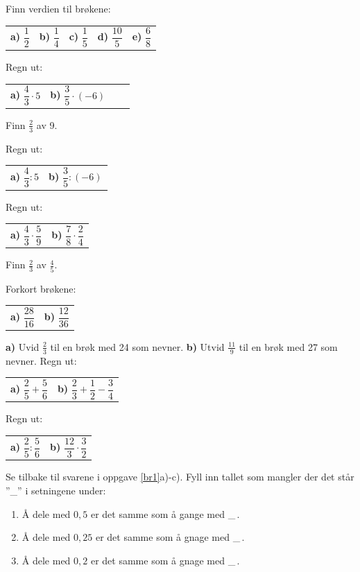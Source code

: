 



\opgt
{}
Finn verdien til brøkene:\os
\begin{tabular}{@{}l l l l l}
	\textbf{a)} $ \dfrac{1}{2} $ & 	
	\textbf{b)} $ \dfrac{1}{4} $ & 	
	\textbf{c)} $ \dfrac{1}{5} $ &
	\textbf{d)} $ \dfrac{10}{5} $  & 
	\textbf{e)} $ \dfrac{6}{8} $
\end{tabular}
\nes

Regn ut:\os
\begin{tabular}{@{}l l l l}
	\textbf{a)} $ \dfrac{4}{3}\cdot5 $ & 	\textbf{b)} $ \dfrac{3}{5}\cdot(-6) $ 
\end{tabular}

Finn $ \frac{2}{3} $ av 9.

\nes
{}
Regn ut:\os
\begin{tabular}{@{}l l}
	\textbf{a)} $ \dfrac{4}{3}:5 $ & 	\textbf{b)} $ \dfrac{3}{5}:(-6) $
\end{tabular}

\nes
{}
Regn ut:\os
\begin{tabular}{@{}l l}
	\textbf{a)} $ \dfrac{4}{3}\cdot\dfrac{5}{9} $ & 	\textbf{b)} $ \dfrac{7}{8}\cdot\dfrac{2}{4} $ 
\end{tabular}

Finn $ \frac{2}{3} $ av $ \frac{4}{5} $.

\nes
\nes

Forkort brøkene:\os
\begin{tabular}{@{}l l}
	\textbf{a)} $ \dfrac{28}{16} $ & 	\textbf{b)} $ \dfrac{12}{36} $ 
\end{tabular}

\textbf{a)} Uvid $ \frac{2}{3} $ til en brøk med 24 som nevner.\os
\textbf{b)} Utvid $ \frac{11}{9} $ til en brøk med 27 som nevner. 
\newpage
\nes
{}
Regn ut:\os
\begin{tabular}{@{}l l }
\textbf{a)}	$ \dfrac{2}{5}+\dfrac{5}{6} $&\textbf{b)} $ \dfrac{2}{3}+\dfrac{1}{2}-\dfrac{3}{4} $
\end{tabular}

\nes
{}
Regn ut:\os
\begin{tabular}{@{}l l }
	\textbf{a)}	$ \dfrac{2}{5}:\dfrac{5}{6} $&\textbf{b)} $ \dfrac{12}{3}\cdot\dfrac{3}{2} $
\end{tabular}

Se tilbake til svarene i oppgave \ref{br1}a)-c). Fyll inn tallet som mangler der det står ''\_'' i setningene under:
{\renewcommand{\labelenumi}{(\alph{enumi})}
\begin{enumerate}
	\item Å dele med $ 0,5 $ er det samme som å gange med \_\,.
	\item Å dele med $ 0,25 $ er det samme som å gnage med \_\,.
	\item Å dele med $ 0,2 $ er det samme som å gnage med \_\,.	
	
\end{enumerate} }

